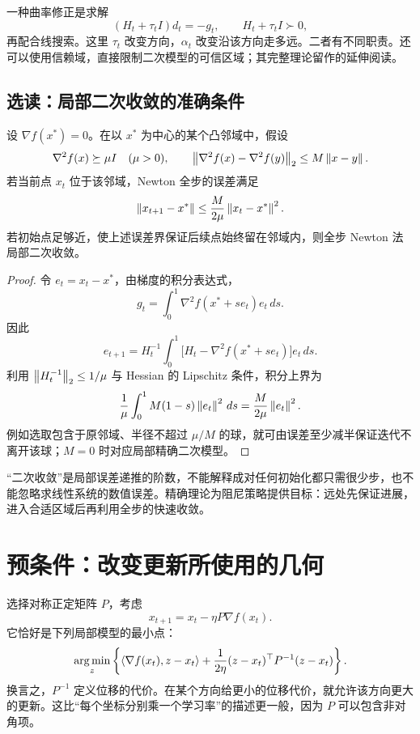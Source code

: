 一种曲率修正是求解
\[
 (H_t+\tau_t I)d_t=-g_t,
 \qquad H_t+\tau_t I\succ0,
\]
再配合线搜索。这里 $\tau_t$ 改变方向，$\alpha_t$ 改变沿该方向走多远。二者有不同职责。还可以使用信赖域，直接限制二次模型的可信区域；其完整理论留作\citet{Nocedal2006}的延伸阅读。

\subsection{选读：局部二次收敛的准确条件}

\begin{theorem}
\label{l1:thm-newton-local}
设 $\nabla f(x^*)=0$。在以 $x^*$ 为中心的某个凸邻域中，假设
\[
 \nabla^2f(x)\succeq\mu I\quad(\mu>0),\qquad
 \left\lVert\nabla^2f(x)-\nabla^2f(y)\right\rVert_2\leq M\left\lVert x-y\right\rVert.
\]
若当前点 $x_t$ 位于该邻域，Newton 全步的误差满足
\begin{equation}
 \left\lVert x_{t+1}-x^*\right\rVert\leq\frac{M}{2\mu}\left\lVert x_t-x^*\right\rVert^2.
 \label{l1:newton-quadratic}
\end{equation}
若初始点足够近，使上述误差界保证后续点始终留在邻域内，则全步 Newton 法局部二次收敛。
\end{theorem}

\begin{proof}
令 $e_t=x_t-x^*$，由梯度的积分表达式，
\[
 g_t=\int_0^1\nabla^2 f(x^*+se_t)e_t\,ds.
\]
因此
\[
 e_{t+1}=H_t^{-1}\int_0^1
 \bigl[H_t-\nabla^2f(x^*+se_t)\bigr]e_t\,ds.
\]
利用 $\left\lVert H_t^{-1}\right\rVert_2\leq1/\mu$ 与 Hessian 的 Lipschitz 条件，积分上界为
\[
 \frac1\mu\int_0^1M(1-s)\left\lVert e_t\right\rVert^2\,ds
 =\frac{M}{2\mu}\left\lVert e_t\right\rVert^2.
\]
例如选取包含于原邻域、半径不超过 $\mu/M$ 的球，就可由误差至少减半保证迭代不离开该球；$M=0$ 时对应局部精确二次模型。
\end{proof}

“二次收敛”是局部误差递推的阶数，不能解释成对任何初始化都只需很少步，也不能忽略求线性系统的数值误差。精确理论为阻尼策略提供目标：远处先保证进展，进入合适区域后再利用全步的快速收敛。

\section{预条件：改变更新所使用的几何}
\label{l1:preconditioning}

选择对称正定矩阵 $P$，考虑
\begin{equation}
 x_{t+1}=x_t-\eta P\nabla f(x_t).
 \label{l1:precondition-update}
\end{equation}
它恰好是下列局部模型的最小点：
\[
 \operatorname*{arg\,min}_z\left\{\left\langle\nabla f(x_t),z-x_t\right\rangle
 +\frac1{2\eta}(z-x_t)^\top P^{-1}(z-x_t)\right\}.
\]
换言之，$P^{-1}$ 定义位移的代价。在某个方向给更小的位移代价，就允许该方向更大的更新。这比“每个坐标分别乘一个学习率”的描述更一般，因为 $P$ 可以包含非对角项。

